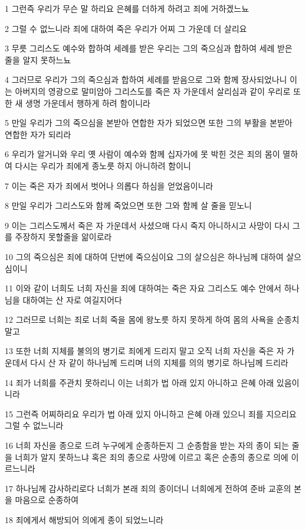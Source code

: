 \par 1 그런즉 우리가 무슨 말 하리요 은혜를 더하게 하려고 죄에 거하겠느뇨
\par 2 그럴 수 없느니라 죄에 대하여 죽은 우리가 어찌 그 가운데 더 살리요
\par 3 무릇 그리스도 예수와 합하여 세례를 받은 우리는 그의 죽으심과 합하여 세례 받은 줄을 알지 못하느뇨
\par 4 그러므로 우리가 그의 죽으심과 합하여 세례를 받음으로 그와 함께 장사되었나니 이는 아버지의 영광으로 말미암아 그리스도를 죽은 자 가운데서 살리심과 같이 우리로 또한 새 생명 가운데서 행하게 하려 함이니라
\par 5 만일 우리가 그의 죽으심을 본받아 연합한 자가 되었으면 또한 그의 부활을 본받아 연합한 자가 되리라
\par 6 우리가 알거니와 우리 옛 사람이 예수와 함께 십자가에 못 박힌 것은 죄의 몸이 멸하여 다시는 우리가 죄에게 종노릇 하지 아니하려 함이니
\par 7 이는 죽은 자가 죄에서 벗어나 의롭다 하심을 얻었음이니라
\par 8 만일 우리가 그리스도와 함께 죽었으면 또한 그와 함께 살 줄을 믿노니
\par 9 이는 그리스도께서 죽은 자 가운데서 사셨으매 다시 죽지 아니하시고 사망이 다시 그를 주장하지 못할줄을 앎이로라
\par 10 그의 죽으심은 죄에 대하여 단번에 죽으심이요 그의 살으심은 하나님께 대하여 살으심이니
\par 11 이와 같이 너희도 너희 자신을 죄에 대하여는 죽은 자요 그리스도 예수 안에서 하나님을 대하여는 산 자로 여길지어다
\par 12 그러므로 너희는 죄로 너희 죽을 몸에 왕노릇 하지 못하게 하여 몸의 사욕을 순종치 말고
\par 13 또한 너희 지체를 불의의 병기로 죄에게 드리지 말고 오직 너희 자신을 죽은 자 가운데서 다시 산 자 같이 하나님께 드리며 너의 지체를 의의 병기로 하나님께 드리라
\par 14 죄가 너희를 주관치 못하리니 이는 너희가 법 아래 있지 아니하고 은혜 아래 있음이니라
\par 15 그런즉 어찌하리요 우리가 법 아래 있지 아니하고 은혜 아래 있으니 죄를 지으리요 그럴 수 없느니라
\par 16 너희 자신을 종으로 드려 누구에게 순종하든지 그 순종함을 받는 자의 종이 되는 줄을 너희가 알지 못하느냐 혹은 죄의 종으로 사망에 이르고 혹은 순종의 종으로 의에 이르느니라
\par 17 하나님께 감사하리로다 너희가 본래 죄의 종이더니 너희에게 전하여 준바 교훈의 본을 마음으로 순종하여
\par 18 죄에게서 해방되어 의에게 종이 되었느니라
